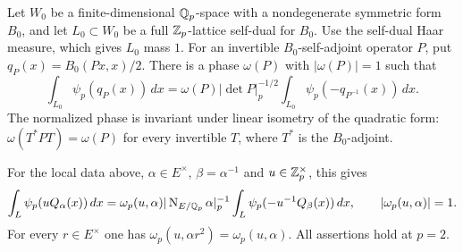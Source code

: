 \begin{lemma}\label{lem:fourier-quadratic-transform}
Let $W_0$ be a finite-dimensional $\mathbb Q_p$-space with a nondegenerate symmetric
form $B_0$, and let $L_0\subset W_0$ be a full $\mathbb Z_p$-lattice self-dual for
$B_0$.  Use the self-dual Haar
measure, which gives $L_0$ mass $1$.  For an invertible $B_0$-self-adjoint
operator $P$, put $q_P(x)=B_0(Px,x)/2$.  There is a phase $\omega(P)$ with
$|\omega(P)|=1$ such that
\begin{equation}\label{eq:fourier-general-quadratic}
 \int_{L_0}\psi_p(q_P(x))\,dx
 =\omega(P)|\det P|_p^{-1/2}
       \int_{L_0}\psi_p(-q_{P^{-1}}(x))\,dx.
\end{equation}
The normalized phase is invariant under linear isometry of the quadratic
form: $\omega(T^*PT)=\omega(P)$ for every invertible $T$, where $T^*$ is
the $B_0$-adjoint.

For the local data above, $\alpha\in E^\times$, $\beta=\alpha^{-1}$ and
$u\in\mathbb Z_p^\times$, this gives
\begin{equation}\label{eq:fourier-quadratic-transform}
 \int_L\psi_p(uQ_\alpha(x))\,dx
 =\omega_p(u,\alpha)|\operatorname{N}_{E/\mathbb Q_p}\alpha|_p^{-1}
       \int_L\psi_p(-u^{-1}Q_\beta(x))\,dx,
 \qquad |\omega_p(u,\alpha)|=1.
\end{equation}
For every $r\in E^\times$ one has
$\omega_p(u,\alpha r^2)=\omega_p(u,\alpha)$.
All assertions hold at $p=2$.
\end{lemma}


